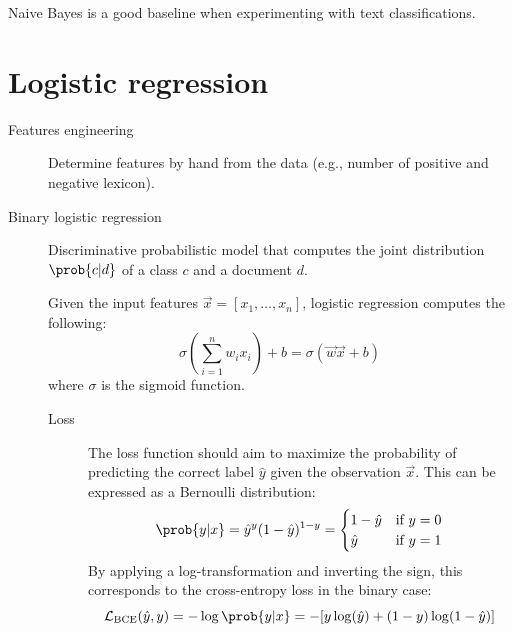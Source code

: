 \begin{remark}
    Naive Bayes is a good baseline when experimenting with text classifications.
\end{remark}



\section{Logistic regression}

\begin{description}
    \item[Features engineering] 
        Determine features by hand from the data (e.g., number of positive and negative lexicon).


    \item[Binary logistic regression] 
        Discriminative probabilistic model that computes the joint distribution $\prob{c | d}$ of a class $c$ and a document $d$.

        Given the input features $\vec{x} = [x_1, \dots, x_n]$, logistic regression computes the following:
        \[ 
            \sigma\left( \sum_{i=1}^{n} w_i x_i \right) + b = \sigma(\vec{w}\vec{x} + b)
        \]
        where $\sigma$ is the sigmoid function.

        \begin{description}
            \item[Loss]
                The loss function should aim to maximize the probability of predicting the correct label $\hat{y}$ given the observation $\vec{x}$. This can be expressed as a Bernoulli distribution:
                \[ 
                    \prob{y | x} = \hat{y}^y (1-\hat{y})^{1-y} = \begin{cases}
                        1 - \hat{y} & \text{if $y=0$} \\
                        \hat{y} & \text{if $y=1$} \\
                    \end{cases} 
                \]
                By applying a log-transformation and inverting the sign, this corresponds to the cross-entropy loss in the binary case:
                \[ \mathcal{L}_{\text{BCE}}(\hat{y}, y) = -\log \prob{y | x} = -[y \log(\hat{y}) + (1-y)\log(1-\hat{y})] \]


\end{description}
\end{description}
